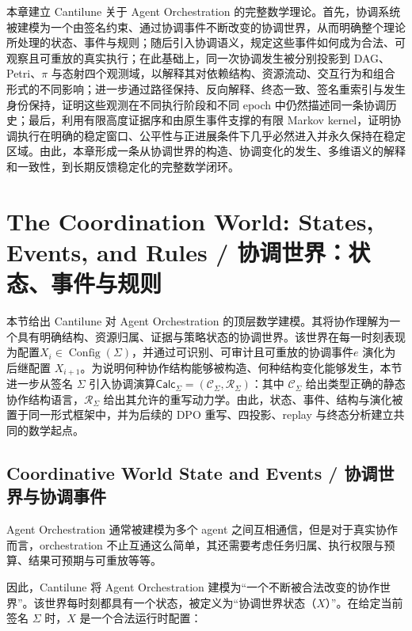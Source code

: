 \label{ch:mathematical-foundations}


本章建立 Cantilune 关于 Agent Orchestration 的完整数学理论。首先，协调系统被建模为一个由签名约束、通过协调事件不断改变的协调世界，从而明确整个理论所处理的状态、事件与规则；随后引入协调语义，规定这些事件如何成为合法、可观察且可重放的真实执行；在此基础上，同一次协调发生被分别投影到 DAG、Petri、$\pi$ 与态射四个观测域，以解释其对依赖结构、资源流动、交互行为和组合形式的不同影响；进一步通过路径保持、反向解释、终态一致、签名重索引与发生身份保持，证明这些观测在不同执行阶段和不同 epoch 中仍然描述同一条协调历史；最后，利用有限高度证据序和由原生事件支撑的有限 Markov kernel，证明协调执行在明确的稳定窗口、公平性与正进展条件下几乎必然进入并永久保持在稳定区域。由此，本章形成一条从协调世界的构造、协调变化的发生、多维语义的解释和一致性，到长期反馈稳定化的完整数学闭环。


\section{The Coordination World: States, Events, and Rules / 协调世界：状态、事件与规则}

本节给出 Cantilune 对 Agent Orchestration 的顶层数学建模。其将协作理解为一个具有明确结构、资源归属、证据与策略状态的协调世界。该世界在每一时刻表现为配置$X_i\in\operatorname{Config}(\Sigma)$，并通过可识别、可审计且可重放的协调事件$e$ 演化为后继配置 $X_{i+1}$。为说明何种协作结构能够被构造、何种结构变化能够发生，本节进一步从签名 $\Sigma$ 引入协调演算$\mathsf{Calc}_{\Sigma}=(\mathcal C_{\Sigma},\mathcal R_{\Sigma})$：其中 $\mathcal C_{\Sigma}$ 给出类型正确的静态协作结构语言，$\mathcal R_{\Sigma}$ 给出其允许的重写动力学。由此，状态、事件、结构与演化被置于同一形式框架中，并为后续的 DPO 重写、四投影、replay 与终态分析建立共同的数学起点。

\subsection{Coordinative World State and Events / 协调世界与协调事件}

Agent Orchestration 通常被建模为多个 agent 之间互相通信，但是对于真实协作而言，orchestration 不止互通这么简单，其还需要考虑任务归属、执行权限与预算、结果可预期与可重放等等。

因此，Cantilune 将 Agent Orchestration 建模为“一个不断被合法改变的协作世界”。该世界每时刻都具有一个状态，被定义为“协调世界状态（$X$）”。在给定当前签名 $\Sigma$ 时，$X$ 是一个合法运行时配置：

